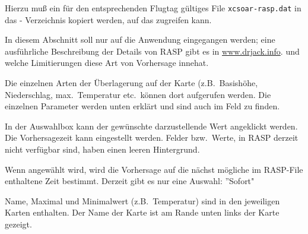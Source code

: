 Hierzu muß ein für den entsprechenden Flugtag gültiges File \verb"xcsoar-rasp.dat"  in
das \xc - Verzeichnis kopiert werden, auf das  \xc zugreifen kann.

In diesem Abschnitt soll nur auf die Anwendung eingegangen werden; eine ausführliche
Beschreibung der Details von RASP gibt es in  \url{www.drjack.info}.
und welche Limitierungen diese Art von Vorhersage innehat.


Die einzelnen Arten der Überlagerung auf der Karte (z.B.\ Basishöhe, Niederschlag,
max.\ Temperatur etc.\  können dort aufgerufen werden.
Die einzelnen Parameter werden unten erklärt und sind auch im Feld  zu finden.


In der Auswahlbox kann der gewünschte darzustellende Wert angeklickt werden.
Die Vorhersagezeit kann eingestellt werden. Felder bzw.\ Werte, in RASP derzeit nicht verfügbar sind,
haben einen leeren Hintergrund.

 Wenn   angewählt wird, wird die Vorhersage auf die nächst mögliche im RASP-File
enthaltene Zeit bestimmt.  Derzeit gibt es nur eine Auswahl: ''Sofort"

Name, Maximal und Minimalwert (z.B.\ Temperatur) sind in den jeweiligen Karten enthalten.
Der Name der Karte ist am Rande unten links der Karte gezeigt.

